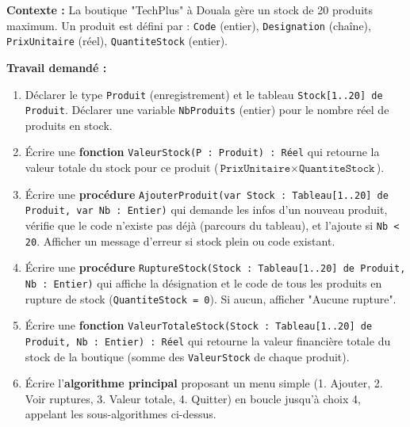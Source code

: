 \documentclass[11pt]{article}
\begin{document}
\begin{exercice}
\textbf{Contexte :} La boutique "TechPlus" à Douala gère un stock de 20 produits maximum. Un produit est défini par : \texttt{Code} (entier), \texttt{Designation} (chaîne), \texttt{PrixUnitaire} (réel), \texttt{QuantiteStock} (entier).

\textbf{Travail demandé :}
\begin{enumerate}
    \item Déclarer le type \texttt{Produit} (enregistrement) et le tableau \texttt{Stock[1..20] de Produit}. Déclarer une variable \texttt{NbProduits} (entier) pour le nombre réel de produits en stock.
    \item Écrire une \textbf{fonction} \texttt{ValeurStock(P : Produit) : Réel} qui retourne la valeur totale du stock pour ce produit ($\texttt{PrixUnitaire} \times \texttt{QuantiteStock}$).
    \item Écrire une \textbf{procédure} \texttt{AjouterProduit(var Stock : Tableau[1..20] de Produit, var Nb : Entier)} qui demande les infos d'un nouveau produit, vérifie que le code n'existe pas déjà (parcours du tableau), et l'ajoute si \texttt{Nb < 20}. Afficher un message d'erreur si stock plein ou code existant.
    \item Écrire une \textbf{procédure} \texttt{RuptureStock(Stock : Tableau[1..20] de Produit, Nb : Entier)} qui affiche la désignation et le code de tous les produits en rupture de stock (\texttt{QuantiteStock = 0}). Si aucun, afficher "Aucune rupture".
    \item Écrire une \textbf{fonction} \texttt{ValeurTotaleStock(Stock : Tableau[1..20] de Produit, Nb : Entier) : Réel} qui retourne la valeur financière totale du stock de la boutique (somme des \texttt{ValeurStock} de chaque produit).
    \item Écrire l'\textbf{algorithme principal} proposant un menu simple (1. Ajouter, 2. Voir ruptures, 3. Valeur totale, 4. Quitter) en boucle jusqu'à choix 4, appelant les sous-algorithmes ci-dessus.
\end{enumerate}
\end{exercice}
\end{document}
